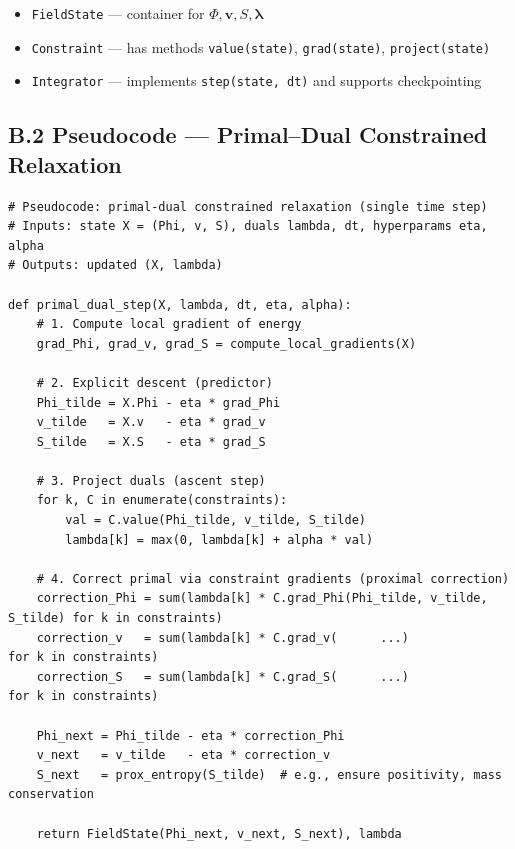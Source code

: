 \documentclass[11pt,a4paper]{article}
\begin{document}
\begin{itemize}
  \item \texttt{FieldState} — container for \(\Phi,\mathbf{v},S,\boldsymbol{\lambda}\)
  \item \texttt{Constraint} — has methods \texttt{value(state)}, \texttt{grad(state)}, \texttt{project(state)}
  \item \texttt{Integrator} — implements \texttt{step(state, dt)} and supports checkpointing
\end{itemize}

\subsection{B.2 Pseudocode — Primal–Dual Constrained Relaxation}

\begin{verbatim}
# Pseudocode: primal-dual constrained relaxation (single time step)
# Inputs: state X = (Phi, v, S), duals lambda, dt, hyperparams eta, alpha
# Outputs: updated (X, lambda)

def primal_dual_step(X, lambda, dt, eta, alpha):
    # 1. Compute local gradient of energy
    grad_Phi, grad_v, grad_S = compute_local_gradients(X)

    # 2. Explicit descent (predictor)
    Phi_tilde = X.Phi - eta * grad_Phi
    v_tilde   = X.v   - eta * grad_v
    S_tilde   = X.S   - eta * grad_S

    # 3. Project duals (ascent step)
    for k, C in enumerate(constraints):
        val = C.value(Phi_tilde, v_tilde, S_tilde)
        lambda[k] = max(0, lambda[k] + alpha * val)

    # 4. Correct primal via constraint gradients (proximal correction)
    correction_Phi = sum(lambda[k] * C.grad_Phi(Phi_tilde, v_tilde, S_tilde) for k in constraints)
    correction_v   = sum(lambda[k] * C.grad_v(      ...)                             for k in constraints)
    correction_S   = sum(lambda[k] * C.grad_S(      ...)                             for k in constraints)

    Phi_next = Phi_tilde - eta * correction_Phi
    v_next   = v_tilde   - eta * correction_v
    S_next   = prox_entropy(S_tilde)  # e.g., ensure positivity, mass conservation

    return FieldState(Phi_next, v_next, S_next), lambda
\end{verbatim}
\end{document}
